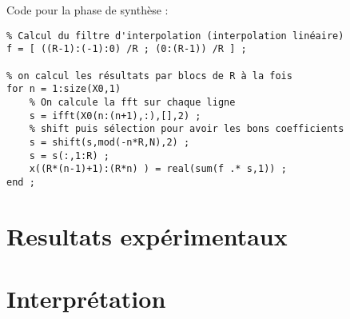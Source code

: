 \documentclass[a4paper,11pt]{article}
\begin{document}
Code pour la phase de synthèse : \\
\begin{verbatim}
% Calcul du filtre d'interpolation (interpolation linéaire)
f = [ ((R-1):(-1):0) /R ; (0:(R-1)) /R ] ;

% on calcul les résultats par blocs de R à la fois
for n = 1:size(X0,1) 
    % On calcule la fft sur chaque ligne
    s = ifft(X0(n:(n+1),:),[],2) ;
    % shift puis sélection pour avoir les bons coefficients
    s = shift(s,mod(-n*R,N),2) ;    
    s = s(:,1:R) ;
    x((R*(n-1)+1):(R*n) ) = real(sum(f .* s,1)) ;
end ;	
\end{verbatim}






\section{Resultats expérimentaux}


\section{Interprétation}
\end{document}
